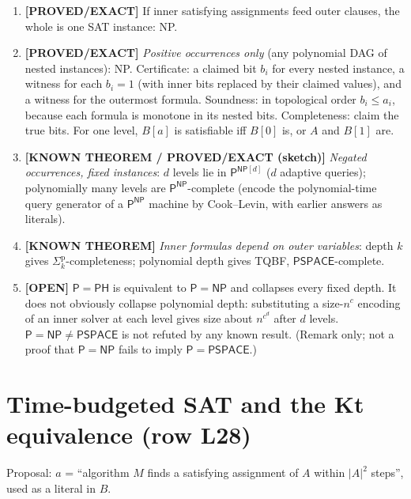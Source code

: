 \documentclass[11pt]{article}
\theoremstyle{remark}
\newcommand{\cP}{\mathsf{P}}
\newcommand{\NP}{\mathsf{NP}}
\newcommand{\PSPACE}{\mathsf{PSPACE}}
\newcommand{\status}[1]{\textbf{[#1]}}
\begin{document}
\begin{enumerate}
\item \status{PROVED/EXACT} If inner satisfying assignments feed outer clauses, the whole is one SAT
instance: NP.
\item \status{PROVED/EXACT} \emph{Positive occurrences only} (any polynomial DAG of nested instances): NP.
Certificate: a claimed bit $b_i$ for every nested instance, a witness for each $b_i=1$ (with inner bits
replaced by their claimed values), and a witness for the outermost formula. Soundness: in topological
order $b_i\le a_i$, because each formula is monotone in its nested bits. Completeness: claim the true bits.
For one level, $B[a]$ is satisfiable iff $B[0]$ is, or $A$ and $B[1]$ are.
\item \status{KNOWN THEOREM / PROVED/EXACT (sketch)} \emph{Negated occurrences, fixed instances}: $d$
levels lie in $\cP^{\NP[d]}$ ($d$ adaptive queries); polynomially many levels are $\cP^{\NP}$-complete
(encode the polynomial-time query generator of a $\cP^{\NP}$ machine by Cook--Levin, with earlier answers
as literals).
\item \status{KNOWN THEOREM} \emph{Inner formulas depend on outer variables}: depth $k$ gives
$\Sigma_k^{\mathrm p}$-completeness; polynomial depth gives TQBF, $\PSPACE$-complete.
\item \status{OPEN} $\cP=\mathsf{PH}$ is equivalent to $\cP=\NP$ and collapses every fixed depth. It does
not obviously collapse polynomial depth: substituting a size-$n^{c}$ encoding of an inner solver at each
level gives size about $n^{c^d}$ after $d$ levels. $\cP=\NP\neq\PSPACE$ is not refuted by any known
result. (Remark only; not a proof that $\cP=\NP$ fails to imply $\cP=\PSPACE$.)
\end{enumerate}

\section{Time-budgeted SAT and the Kt equivalence (row L28)}

Proposal: $a$ = ``algorithm $M$ finds a satisfying assignment of $A$ within $|A|^2$ steps'', used as a
literal in $B$.
\end{document}
